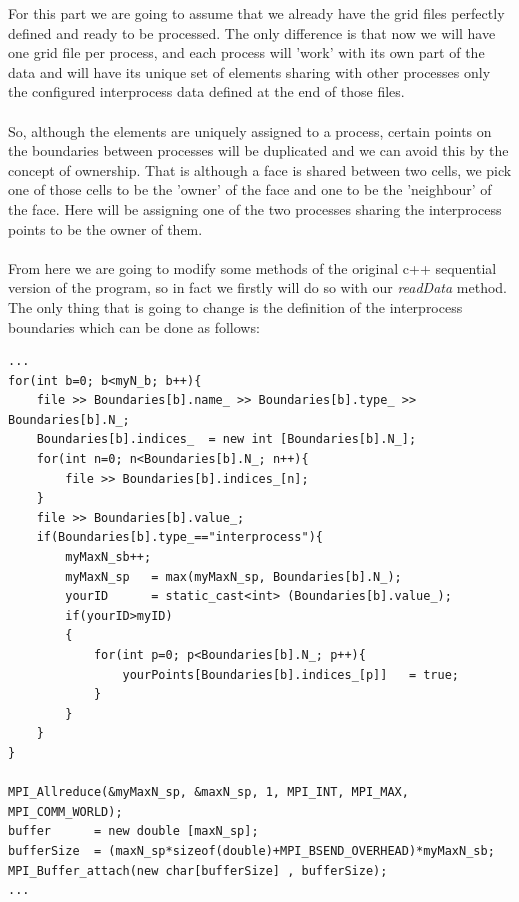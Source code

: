 \documentclass[12pt]{article}
\begin{document}
For this part we are going to assume that we already have the grid files perfectly defined and ready to be processed. The only difference is that now we will have one grid file per process, and each process will 'work' with its own part of the data and will have its unique set of elements sharing with other processes only the configured interprocess data defined at the end of those files.
\\\\
So, although the elements are uniquely assigned to a process, certain points on the boundaries between processes will be
duplicated and we can avoid this by the concept of ownership. That is although a face is shared between two cells, we pick one of those cells to be the 'owner' of the face and one to be the 'neighbour' of the face. Here will be assigning one of the two processes sharing the interprocess points to be the owner of them.
\\\\
From here we are going to modify some methods of the original c++ sequential version of the program, so in fact we firstly will do so with our \textit{readData} method. The only thing that is going to change is the definition of the interprocess boundaries which can be done as follows:

\begin{lstlisting}[style=MyC++Style] 
...
for(int b=0; b<myN_b; b++){
	file >> Boundaries[b].name_ >> Boundaries[b].type_ >> Boundaries[b].N_;
	Boundaries[b].indices_  = new int [Boundaries[b].N_];
	for(int n=0; n<Boundaries[b].N_; n++){
		file >> Boundaries[b].indices_[n];
	}
	file >> Boundaries[b].value_;
	if(Boundaries[b].type_=="interprocess"){
		myMaxN_sb++;
		myMaxN_sp	= max(myMaxN_sp, Boundaries[b].N_);
		yourID		= static_cast<int> (Boundaries[b].value_);
		if(yourID>myID)
		{
			for(int p=0; p<Boundaries[b].N_; p++){
				yourPoints[Boundaries[b].indices_[p]]	= true;
			}
		}
	}
}

MPI_Allreduce(&myMaxN_sp, &maxN_sp, 1, MPI_INT, MPI_MAX, MPI_COMM_WORLD);
buffer		= new double [maxN_sp];
bufferSize	= (maxN_sp*sizeof(double)+MPI_BSEND_OVERHEAD)*myMaxN_sb;
MPI_Buffer_attach(new char[bufferSize] , bufferSize);
...
\end{lstlisting}
\end{document}

